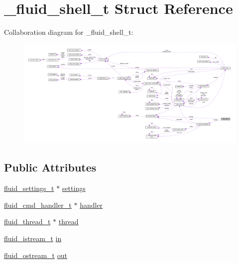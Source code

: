 \hypertarget{struct__fluid__shell__t}{}\section{\+\_\+fluid\+\_\+shell\+\_\+t Struct Reference}
\label{struct__fluid__shell__t}


Collaboration diagram for \+\_\+fluid\+\_\+shell\+\_\+t\+:
\nopagebreak
\begin{figure}[H]
\begin{center}
\leavevmode
\includegraphics[width=350pt]{struct__fluid__shell__t__coll__graph}
\end{center}
\end{figure}
\subsection*{Public Attributes}
\begin{DoxyCompactItemize}
\item 
\hyperlink{types_8h_aa363402d3c77333b0f070ba531d034ba}{fluid\+\_\+settings\+\_\+t} $\ast$ \hyperlink{struct__fluid__shell__t_aea94d440631a695b47d8a36a17ac1eab}{settings}
\item 
\hyperlink{types_8h_ae1944df078b25beb347abd07e42b35a4}{fluid\+\_\+cmd\+\_\+handler\+\_\+t} $\ast$ \hyperlink{struct__fluid__shell__t_ad82ffb069af502faae17a8c9187c12b9}{handler}
\item 
\hyperlink{fluid__sys_8h_a60a6466e68a45b0f0709f1ebaa7e6f85}{fluid\+\_\+thread\+\_\+t} $\ast$ \hyperlink{struct__fluid__shell__t_ae8d173944c48140af913a50899272897}{thread}
\item 
\hyperlink{types_8h_a436fa1df8d13a21321d39902b0d60208}{fluid\+\_\+istream\+\_\+t} \hyperlink{struct__fluid__shell__t_a08df72f9b4f053d7c8f4f787848ec732}{in}
\item 
\hyperlink{types_8h_a6d8c441b84ab0430e358438cee876c69}{fluid\+\_\+ostream\+\_\+t} \hyperlink{struct__fluid__shell__t_ad06a4d5f08bd010ba4d30e7aa90c0435}{out}
\end{DoxyCompactItemize}


